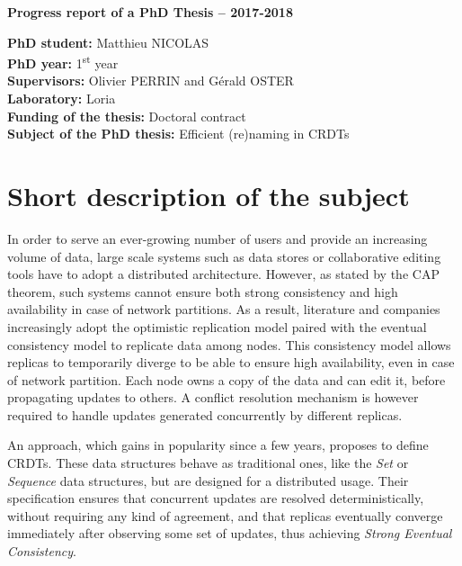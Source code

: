 \documentclass[11pt]{article}
\begin{document}
\bigskip
\centerline{\Large\textbf{Progress report of a PhD Thesis -- 2017-2018}}
\bigskip
\bigskip

\noindent\textbf{PhD student:}
Matthieu NICOLAS
\\

\noindent\textbf{PhD year:}
1\textsuperscript{st} year
\\

\noindent\textbf{Supervisors:}
Olivier PERRIN and Gérald OSTER
\\

\noindent\textbf{Laboratory:}
\ac{Loria}
\\

\noindent\textbf{Funding of the thesis:}
Doctoral contract
\\

\noindent\textbf{Subject of the PhD thesis:}
Efficient (re)naming in \acp{CRDT}
\\


\section*{Short description of the subject}

\hspace{1em} In order to serve an ever-growing number of users and provide an increasing volume of data,
large scale systems such as data stores or collaborative editing tools have to adopt a distributed architecture.
However, as stated by the CAP theorem, such systems cannot ensure both strong consistency and high availability in case of network partitions.
As a result, literature and companies increasingly adopt the optimistic replication model paired with the eventual consistency model to replicate data among nodes.
This consistency model allows replicas to temporarily diverge to be able to ensure high availability, even in case of network partition.
Each node owns a copy of the data and can edit it, before propagating updates to others.
A conflict resolution mechanism is however required to handle updates generated concurrently by different replicas.

An approach, which gains in popularity since a few years, proposes to define \acfp{CRDT}.
These data structures behave as traditional ones, like the \emph{Set} or \emph{Sequence} data structures, but are designed for a distributed usage.
Their specification ensures that concurrent updates are resolved deterministically, without requiring any kind of agreement, and that replicas eventually converge immediately after observing some set of updates,
thus achieving \emph{Strong Eventual Consistency}.
\end{document}
